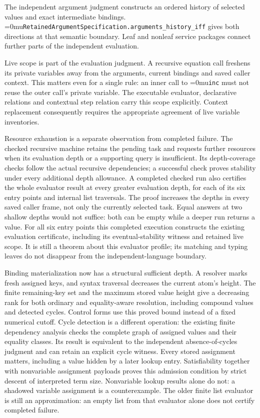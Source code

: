 \documentclass[11pt,a4paper]{article}
\newcommand{\name}[1]{\textup{\Urlmuskip=0mu\relax\nolinkurl{#1}}}
\begin{document}
The independent argument judgment constructs an ordered history of selected
values and exact intermediate bindings.
\name{RetainedArgumentSpecification.arguments_history_iff} gives both
directions at that semantic boundary. Leaf and nonleaf service packages
connect further parts of the independent evaluation.

Live scope is part of the evaluation judgment. A recursive equation call
freshens its private variables away from the arguments, current bindings and
saved caller context. This matters even for a single rule: an inner call to
\name{inc} must not reuse the outer call's private variable. The executable
evaluator, declarative relations and contextual step relation carry this
scope explicitly. Context replacement consequently requires the appropriate
agreement of live variable inventories.

Resource exhaustion is a separate observation from completed failure.
The checked recursive machine retains the pending task and requests further
resources when its evaluation depth or a supporting query is insufficient.
Its depth-coverage checks follow the actual recursive dependencies; a
successful check proves stability under every additional depth allowance.
A completed checked run also certifies the whole evaluator result at every
greater evaluation depth, for each of its six entry points and internal list
traversals. The proof increases the depths in every saved caller frame, not
only the currently selected task. Equal answers at two shallow depths would
not suffice: both can be empty while a deeper run returns a value.
For all six entry points this completed execution constructs the existing
evaluation certificate, including its eventual-stability witness and retained
live scope. It is still a theorem about this evaluator profile; its matching
and typing leaves do not disappear from the independent-language boundary.

Binding materialization now has a structural sufficient depth. A resolver
marks fresh assigned keys, and syntax traversal decreases the current atom's
height. The finite remaining-key set and the maximum stored value height give
a decreasing rank for both ordinary and equality-aware resolution, including
compound values and detected cycles. Control forms use this proved bound
instead of a fixed numerical cutoff. Cycle detection is a different operation:
the existing finite dependency analysis checks the complete graph of assigned
values and their equality classes. Its result is equivalent to the independent
absence-of-cycles judgment and can retain an explicit cycle witness. Every
stored assignment matters, including a value hidden by a later lookup entry.
Satisfiability together with nonvariable assignment payloads proves this
admission condition by strict descent of interpreted term size. Nonvariable
lookup results alone do not: a shadowed variable assignment is a counterexample.
The older finite list evaluator is still an approximation:
an empty list from that evaluator alone does not certify completed failure.
\end{document}
